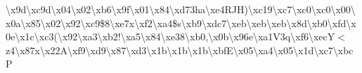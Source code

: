 \begin{DoxyCompactItemize}
\textbackslash{}x9d\textbackslash{}xc9d\textbackslash{}x04\textbackslash{}x02\textbackslash{}xb6\textbackslash{}x9f\textbackslash{}x01\textbackslash{}x84\textbackslash{}xd73ha\textbackslash{}xe4\+R\+J\+H)\textbackslash{}xc19\textbackslash{}xc7\textbackslash{}xc0\textbackslash{}xc0\textbackslash{}x00\textbackslash{}x0a\textbackslash{}x85\textbackslash{}x02\textbackslash{}x92\textbackslash{}xc9\$8\textbackslash{}xe7x\textbackslash{}xf2\textbackslash{}xa4\$s\textbackslash{}xb9\textbackslash{}xdc7\textbackslash{}xeb\textbackslash{}xeb\textbackslash{}xeb\textbackslash{}x8d\textbackslash{}xb0\textbackslash{}xfd\textbackslash{}x0e\textbackslash{}x1c\textbackslash{}xc3(\textbackslash{}x92\textbackslash{}xa3\textbackslash{}xb2!\textbackslash{}xa5\textbackslash{}x84\textbackslash{}xe38\textbackslash{}xb0,\textbackslash{}x0b\textbackslash{}x96e\textbackslash{}xa1\+V3q\textbackslash{}xf6\textbackslash{}xec\+Y$<$z4\textbackslash{}x87x\textbackslash{}x22\+A\textbackslash{}xf9\textbackslash{}xd9\textbackslash{}x87\textbackslash{}xd3\textbackslash{}x1b\textbackslash{}x1b\textbackslash{}x1b\textbackslash{}xbf\+E\textbackslash{}x05\textbackslash{}xa4\textbackslash{}x05\textbackslash{}x1d\textbackslash{}xc7\textbackslash{}xbc\+P 
\end{DoxyCompactItemize}
